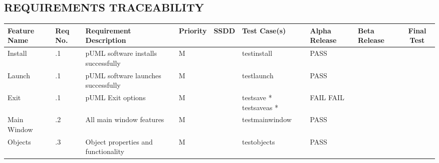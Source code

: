 \documentclass[twoside,letterpaper]{article}
\begin{document}

\clearpage

\begin{landscape}

\section[REQUIREMENTS TRACEABILITY]
  {\bfseries REQUIREMENTS TRACEABILITY}
{\itshape }

\bigskip

\begin{flushleft}
\tablehead{}
\begin{supertabular}[c]{|
                        m{0.9in}|m{0.4in}|m{2.0in}|
                        m{0.4in}|m{0.5in}|m{1.0in}|
                        m{1.0in}|m{1.0in}|c|
                       }
\hline
 
  \centering \bfseries Feature Name &
  \centering \bfseries Req No. &
  \centering \bfseries Requirement Description &
  \centering \bfseries Priority &
  \centering \bfseries SSDD &
  \centering \bfseries Test Case(s) & 
  \centering \bfseries Alpha Release &
  \centering \bfseries Beta Release &
  \bfseries Final Test
\\\hline
  
  Install
  & .1
  & pUML software installs successfully
  & \centering M 
  & ~
  & testinstall
  & PASS
  & ~ 
  & ~ 
\\\hline

  Launch
  & .1
  & pUML software launches successfully
  & \centering M 
  & ~
  & testlaunch
  & PASS
  & ~ 
  & ~ 
\\\hline

  Exit
  & .1
  & pUML Exit options 
  & \centering M 
  & ~
  & testsave *\newline
    testsaveas *
  & FAIL \newline
    FAIL 
  & ~ \newline
    ~
  & ~ \newline
    ~
\\\hline

  Main Window
  & .2
  & All main window features 
  & \centering M 
  & ~
  & testmainwindow 
  & PASS
  & ~ 
  & ~ 
\\\hline

  Objects
  & .3
  & Object properties and functionality
  & \centering M 
  & ~ 
  & testobjects
  & PASS
  & ~ 
  & ~ 
\\\hline


\end{supertabular}
\end{flushleft}
\end{landscape}
\end{document}
